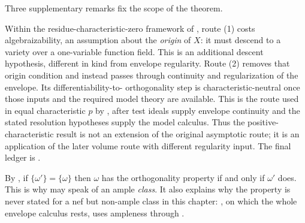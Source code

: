 Three supplementary remarks fix the scope of the theorem.

\begin{remark}
\label{rem:ch27-two-routes}
Within the residue-characteristic-zero framework of \cite{BFJ15}, route
(1) costs algebraizability, an assumption about the \emph{origin} of $X$:
it must descend to a variety over a one-variable function field.  This is
an additional descent hypothesis, different in kind from envelope
regularity.
Route (2) removes that origin condition and instead passes through
continuity and regularization of the envelope.  Its differentiability-to-
orthogonality step is characteristic-neutral once those inputs and the
required model theory are available.  This is the route used in equal
characteristic $p$ by \cite[Theorem~9.2]{GJKM19}, after test ideals supply
envelope continuity and the stated resolution hypotheses supply the model
calculus.  Thus the positive-characteristic result is not an extension of
the original asymptotic route; it is an application of the later volume
route with different regularity input.  The final ledger is
.
\end{remark}

\begin{remark}
\label{rem:ch27-orthogonality-class}
By , if
$\{\omega'\}=\{\omega\}$ then $\omega$ has the orthogonality property if
and only if $\omega'$ does.  This is why
 may speak of an ample \emph{class}.  It
also explains why the property is never stated for a nef but non-ample
class in this chapter: , on which the
whole envelope calculus rests, uses ampleness through
.
\end{remark}

\begin{center}
\end{center}

